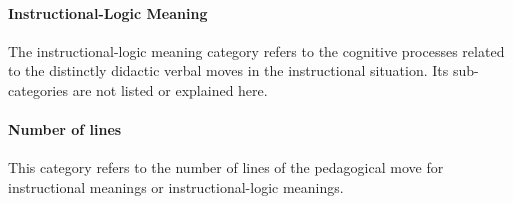 \documentclass[conference]{IEEEtran}
\begin{document}
    \paragraph{Instructional-Logic Meaning} The instructional-logic meaning
    category refers to the cognitive processes related to the distinctly
    didactic verbal moves in the instructional situation. Its sub-categories are
    not listed or explained here.
    \paragraph{Number of lines} This category refers to the number of lines of
    the pedagogical move for instructional meanings or instructional-logic meanings.
\end{document}
